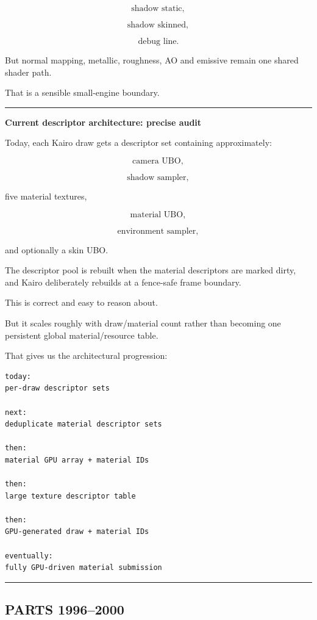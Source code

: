 \[
\text{shadow static},
\]

\[
\text{shadow skinned},
\]

\[
\text{debug line}.
\]

But normal mapping, metallic, roughness, AO and emissive remain one shared shader path.

That is a sensible small-engine boundary.

\begin{center}\rule{0.5\linewidth}{0.5pt}\end{center}

\textbf{Current descriptor architecture: precise audit}

Today, each Kairo draw gets a descriptor set containing approximately:

\[
\text{camera UBO},
\]

\[
\text{shadow sampler},
\]

five material textures,

\[
\text{material UBO},
\]

\[
\text{environment sampler},
\]

and optionally a skin UBO.

The descriptor pool is rebuilt when the material descriptors are marked dirty, and Kairo deliberately rebuilds at a fence-safe frame boundary.

This is correct and easy to reason about.

But it scales roughly with draw/material count rather than becoming one persistent global material/resource table.

That gives us the architectural progression:

\begin{verbatim}
today:
per-draw descriptor sets

next:
deduplicate material descriptor sets

then:
material GPU array + material IDs

then:
large texture descriptor table

then:
GPU-generated draw + material IDs

eventually:
fully GPU-driven material submission
\end{verbatim}

\begin{center}\rule{0.5\linewidth}{0.5pt}\end{center}

\subsection{PARTS 1996--2000}\label{03-visual-computing-i-ch006-parts-19962000}

